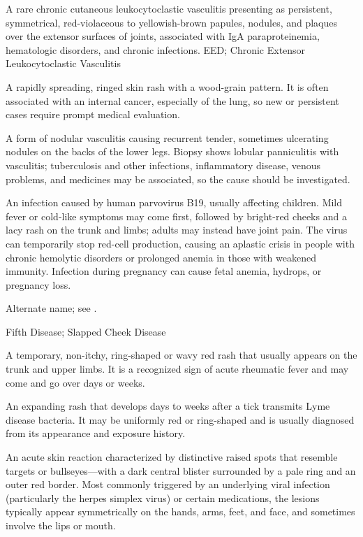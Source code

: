  A rare chronic cutaneous leukocytoclastic vasculitis presenting as persistent, symmetrical, red-violaceous to yellowish-brown papules, nodules, and plaques over the extensor surfaces of joints, associated with IgA paraproteinemia, hematologic disorders, and chronic infections.
\synonyms
EED; Chronic Extensor Leukocytoclastic Vasculitis

 A rapidly spreading, ringed skin rash with a wood-grain pattern. It is often associated with an internal cancer, especially of the lung, so new or persistent cases require prompt medical evaluation.

 A form of nodular vasculitis causing recurrent tender, sometimes ulcerating nodules on the backs of the lower legs. Biopsy shows lobular panniculitis with vasculitis; tuberculosis and other infections, inflammatory disease, venous problems, and medicines may be associated, so the cause should be investigated.

 An infection caused by human parvovirus B19, usually affecting children. Mild fever or cold-like symptoms may come first, followed by bright-red cheeks and a lacy rash on the trunk and limbs; adults may instead have joint pain. The virus can temporarily stop red-cell production, causing an aplastic crisis in people with chronic hemolytic disorders or prolonged anemia in those with weakened immunity. Infection during pregnancy can cause fetal anemia, hydrops, or pregnancy loss.

 Alternate name; see .

\synonyms
Fifth Disease; Slapped Cheek Disease

 A temporary, non-itchy, ring-shaped or wavy red rash that usually appears on the trunk and upper limbs. It is a recognized sign of acute rheumatic fever and may come and go over days or weeks.

 An expanding rash that develops days to weeks after a tick transmits Lyme disease bacteria. It may be uniformly red or ring-shaped and is usually diagnosed from its appearance and exposure history.

 An acute skin reaction characterized by distinctive raised spots that resemble targets or bullseyes---with a dark central blister surrounded by a pale ring and an outer red border. Most commonly triggered by an underlying viral infection (particularly the herpes simplex virus) or certain medications, the lesions typically appear symmetrically on the hands, arms, feet, and face, and sometimes involve the lips or mouth.

